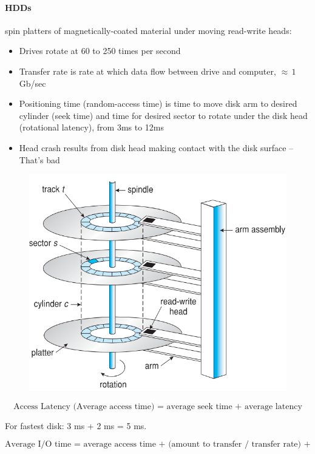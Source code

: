 \paragraph{HDDs} spin platters of magnetically-coated material under moving
read-write heads:


\begin{itemize}
    \item Drives rotate at 60 to 250 times per second
    \item Transfer rate is rate at which data flow between drive and computer, $\approx\,1$ Gb/sec
    \item Positioning time (random-access time) is time to move disk arm to desired cylinder (seek time) and time for desired sector to rotate under the disk head (rotational latency), from 3ms to 12ms
    \item Head crash results from disk head making contact with the disk surface -- That’s bad
\end{itemize}

\begin{figure}[h!]
    \centering
    \includegraphics[width=0.75\linewidth]{img/yys.png}
\end{figure}


\begin{equation*}
    \text{Access Latency (Average access time) = average seek time + average latency}
\end{equation*}

For fastest disk: 3 ms + 2 ms = 5 ms.

\begin{equation*}
    \text{Average I/O time = average access time + (amount to transfer / transfer rate) + controller overhead}
\end{equation*}

